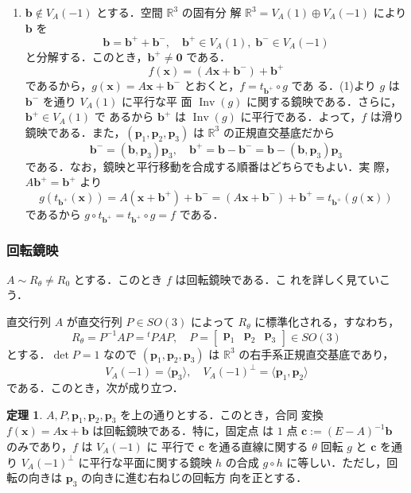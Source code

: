\documentclass[11pt, uplatex, dvipdfmx, titlepage]{jsarticle}
\makeatletter
\DeclareMathOperator{\Inv}{Inv}
\renewenvironment{proof}[1][\proofname]{\par
  \pushQED{\qed}%
  \normalfont \topsep6\p@\@plus6\p@\relax
  \trivlist
  \item[\hskip\labelsep
         \bfseries
    {#1}]\ignorespaces
}{%
  \popQED\endtrivlist\@endpefalse
}
\theoremstyle{definition}
\newtheorem{theorem}{定理}[section]
\renewcommand{\proofname}{\textbf{証明}}
\makeatother
\begin{document}
\begin{proof}[定理\ref{thm:RefOrGlide3}の証明]
\begin{enumerate}[(1)]
  \item $\bm{b} \notin V_A(-1)$ とする．空間 $\mathbb{R}^3$ の固有分
    解 $\mathbb{R}^3 = V_A(1) \oplus V_A(-1)$ により $\bm{b}$ を
    \[
      \bm{b} = \bm{b}^{+} + \bm{b}^{-}, \quad \bm{b}^{+} \in V_A(1),
      \; \bm{b}^{-} \in V_A(-1)
    \]
    と分解する．このとき，$\bm{b}^{+} \neq \bm{0}$ である．
    \[
      f(\bm{x}) = \left(A\bm{x} + \bm{b}^{-}\right) + \bm{b}^{+}
    \]
    であるから，$g(\bm{x}) = A\bm{x} + \bm{b}^{-}$
    とおくと，$f = t_{\bm{b}^{+}} \circ g$ であ
    る．(1)より $g$ は $\bm{b}^{-}$ を通り $V_A(1)$ に平行な平
    面 $\Inv(g)$ に関する鏡映である．さらに，$\bm{b}^{+} \in V_A(1)$ で
    あるから $\bm{b}^{+}$ は $\Inv(g)$ に平行である．よって，$f$ は滑り
    鏡映である．また，$(\bm{p}_1, \bm{p}_2,
    \bm{p}_3)$ は $\mathbb{R}^3$ の正規直交基底だから
    \[
      \bm{b}^{-} = (\bm{b}, \bm{p}_3)\bm{p}_3, \quad
      \bm{b}^{+}=\bm{b}-\bm{b}^{-}=\bm{b}-(\bm{b},\bm{p}_3)\bm{p}_3
    \]
    である．なお，鏡映と平行移動を合成する順番はどちらでもよい．実
    際，$A\bm{b}^{+}=\bm{b}^{+}$ より
    \[
      g\left(t_{\bm{b}^{+}}(\bm{x})\right) = A\left(\bm{x}+\bm{b}^{+}\right)+\bm{b}^{-}
      = \left(A\bm{x}+\bm{b}^{-}\right) + \bm{b}^{+} = t_{\bm{b}^{+}}\left( g(\bm{x})\right)
    \]
    であるから $g\circ t_{\bm{b}^{+}} = t_{\bm{b}^{+}}\circ g=f$ である．
  \end{enumerate}
\end{proof}


\subsubsection{回転鏡映}

$A \sim R_{\theta} \neq R_0$ とする．このとき $f$ は回転鏡映である．こ
れを詳しく見ていこう．

直交行列 $A$ が直交行列 $P \in SO(3)$ によって $R_{\theta}$ に標準化される，すなわち，
\[
  R_{\theta}=P^{-1}AP = {}^{t}PAP, \quad P=\left[
    \begin{array}{ccc}
      \bm{p}_1 & \bm{p}_2 & \bm{p}_3
    \end{array}
  \right] \in SO(3)
\]
とする．$\det P=1$ なので $(\bm{p}_1, \bm{p}_2,
\bm{p}_3)$ は $\mathbb{R}^3$ の右手系正規直交基底であり，
\[
  V_A(-1) = \langle \bm{p}_3\rangle, \quad V_A(-1)^{\perp}=\langle
  \bm{p}_1, \bm{p}_2\rangle
\]
である．このとき，次が成り立つ．

\begin{theorem}\label{thm:rotref3}
  $A, P, \bm{p}_1, \bm{p}_2, \bm{p}_3$ を上の通りとする．このとき，合同
  変換 $f(\bm{x}) = A\bm{x}+\bm{b}$ は回転鏡映である．特に，固定点
  は $1$ 点 $\bm{c}:=(E-A)^{-1}\bm{b}$ のみであり，$f$ は $V_A(-1)$ に
  平行で $\bm{c}$ を通る直線に関する $\theta$ 回転 $g$ と $\bm{c}$ を通
  り $V_A(-1)^{\perp}$ に平行な平面に関する鏡映 $h$ の合成 $g \circ h$
  に等しい．ただし，回転の向きは $\bm{p}_3$ の向きに進む右ねじの回転方
  向を正とする．
\end{theorem}
\end{document}
